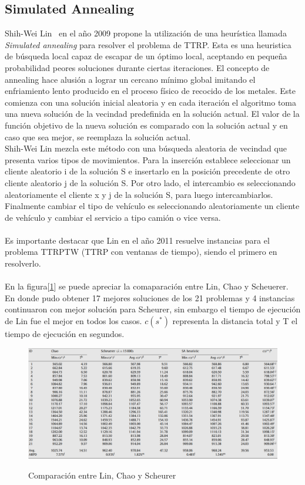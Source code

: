 \documentclass[letter, 10pt]{article}
\begin{document}
\subsection{Simulated Annealing}
Shih-Wei Lin~\cite{Lin} en el año 2009 propone la utilización de una heurística llamada \textit{Simulated annealing} para resolver el problema de TTRP. Esta es una heuristica de búsqueda local capaz de escapar de un óptimo local, aceptando en pequeña probabilidad peores soluciones durante ciertas iteraciones. El concepto de annealing hace alusión a lograr un cercano mínimo global imitando el enfriamiento lento producido en el proceso físico de recocido de los metales. Este comienza con una solución inicial aleatoria y en cada iteración el algoritmo toma una nueva solución de la vecindad predefinida en la solución actual. El valor de la función objetivo de la nueva solución es comparado con la solución actual y en caso que sea mejor, se reemplaza la solución actual.
\\Shih-Wei Lin \cite{Lin} mezcla este método con una búsqueda aleatoria de vecindad que presenta varios tipos de movimientos. Para la inserción establece seleccionar un cliente aleatorio i de la solución S e insertarlo en la posición precedente de otro cliente aleatorio j de la solución S. Por otro lado, el intercambio es seleccionando aleatoriamente el cliente x y j de la solución S, para luego intercambiarlos. Finalmente cambiar el tipo de vehículo es seleccionando aleatoriamente un cliente de vehículo y cambiar el servicio a tipo camión o vice versa.\\
\\
Es importante destacar que Lin en el año 2011 resuelve instancias para el problema TTRPTW (TTRP con ventanas de tiempo), siendo el primero en resolverlo.\\\\
En la figura[\ref{fig:Lin}] se puede apreciar la comaparación entre Lin, Chao y Scheuerer. En donde pudo obtener 17 mejores soluciones de los 21 problemas y 4 instancias continuaron con mejor solución para Scheurer, sin embargo el tiempo de ejecución de Lin fue el mejor en todos los casos. $c(s^{*})$ representa la distancia total y T el tiempo de ejecución en segundos.

\begin{figure}[h]
    \centering
    \caption{Comparación entre Lin, Chao y Scheurer}
    \vspace{0.5cm}
    \includegraphics[scale=0.54]{Images/Lin.png}
    \label{fig:Lin}
\end{figure}
\newpage
\end{document}
